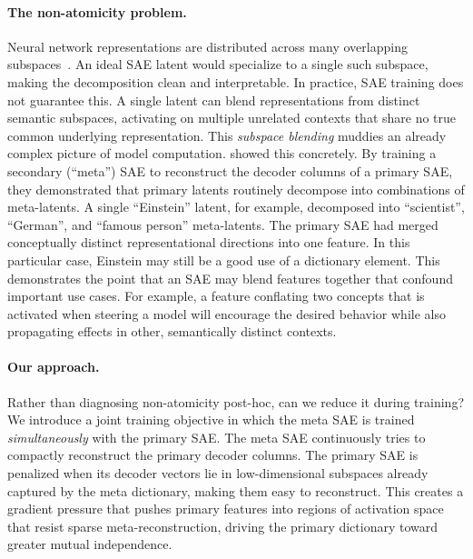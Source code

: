 \documentclass{article} %
\begin{document}
\paragraph{The non-atomicity problem.}
Neural network representations are distributed across many overlapping
subspaces~\citep{elhage2022superposition}.
An ideal SAE latent would specialize to a single such subspace, making the
decomposition clean and interpretable.
In practice, SAE training does not guarantee this. A single latent can blend
representations from distinct semantic subspaces, activating on multiple unrelated
contexts that share no true common underlying representation.
This \emph{subspace blending} muddies an already complex picture of model
computation.
\citet{bussmann2024metasaes} showed this concretely. By training a secondary
(``meta'') SAE to reconstruct the decoder columns of a primary SAE, they
demonstrated that primary latents routinely decompose into combinations of
meta-latents.
A single ``Einstein'' latent, for example, decomposed into ``scientist'',
``German'', and ``famous person'' meta-latents. The primary
SAE had merged conceptually distinct representational directions into one feature.
In this particular case, Einstein may still be a good use of a dictionary element.
This demonstrates the point that an SAE may blend features together that confound
important use cases. For example, a feature conflating two concepts that is activated
when steering a model will encourage the desired behavior while also propagating
effects in other, semantically distinct contexts.

\paragraph{Our approach.}
Rather than diagnosing non-atomicity post-hoc, can we reduce it during training?
We introduce a joint training objective in which the meta SAE is trained
\emph{simultaneously} with the primary SAE.
The meta SAE continuously tries to compactly reconstruct the primary decoder
columns. The primary SAE is penalized when its decoder vectors lie in low-dimensional
subspaces already captured by the meta dictionary, making them easy to reconstruct.
This creates a gradient pressure that pushes primary features into regions of
activation space that resist sparse meta-reconstruction, driving the primary dictionary
toward greater mutual independence.
\end{document}
